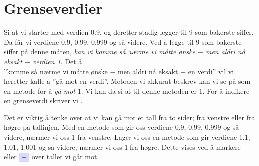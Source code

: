 




\section{Grenseverdier}
Si at vi starter med verdien 0.9, og deretter stadig legger til 9 som bakerste siffer. Da får vi verdiene 0.9, 0.99, 0.999 og så videre. Ved å legge til 9 som bakerste siffer på denne måten, \textsl{kan vi komme så nærme vi måtte ønske $ - $ men aldri nå eksakt $ - $ verdien 1}. Det å \\''komme så nærme vi måtte ønske $ - $ men aldri nå eksakt $ - $ en verdi'' vil vi heretter kalle å ''gå mot en verdi''. Metoden vi akkurat beskrev kan vi se på som en metode for å \textsl{gå mot} 1. Vi kan da si at  til denne metoden er 1. 
For å indikere en grenseverdi skriver vi \sym{$ \lim $}.\vsk

Det er viktig å tenke over at vi kan gå mot et tall fra to sider; fra venstre eller fra høgre på tallinjen. Med en metode som gir oss verdiene 0.9, 0.99, 0.999 og så videre, nærmer vi oss 1 fra venstre. Lager vi oss en metode som gir verdiene 1.1, 1.01, 1.001 og så videre, nærmer vi oss 1 fra høgre. Dette vises ved å markere \sym{$ + $} eller $ \sym{$ - $} $ over tallet vi går mot. 

\regv


\newpage

